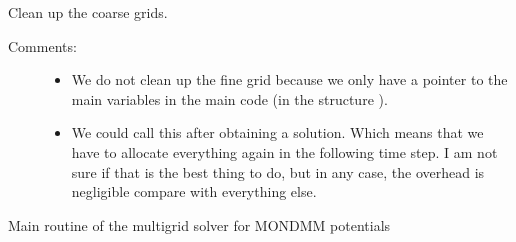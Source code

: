 \documentclass[letterpaper,10pt,english]{sphinxmanual}
\begin{document}

\begin{fulllineitems}
\label{\detokenize{sphinx-c-apidoc/output/gravity/mond_mass/solve_multigrid_mm_c:c.deallocate_grids_mm}}%
\pysigstartmultiline
{}%
\pysigstopmultiline
Clean up the coarse grids.
\begin{description}
\item[{Comments:}] \leavevmode\begin{itemize}
\item {} 
We do not clean up the fine grid because we only have a pointer to the
main variables in the main code (in the structure ).

\item {} 
We could call this after obtaining a solution.  Which means that we
have to allocate everything again in the following time step.
I am not sure if that is the best thing to do, but in any case,
the overhead is negligible compare with everything else.

\end{itemize}

\end{description}

\end{fulllineitems}


\begin{fulllineitems}
\label{\detokenize{sphinx-c-apidoc/output/gravity/mond_mass/solve_multigrid_mm_c:c.solve_multigrid_mm}}%
\pysigstartmultiline
{}%
\pysigstopmultiline
Main routine of the multigrid solver for MOND\sphinxhyphen{}MM potentials

\end{fulllineitems}
\end{document}
